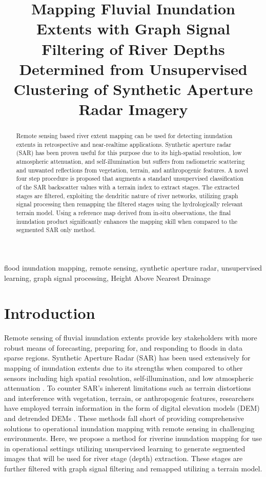 \documentclass{article}
\title{Mapping Fluvial Inundation Extents with Graph Signal Filtering of River Depths Determined from Unsupervised Clustering of Synthetic Aperture Radar Imagery}
\begin{document}
\topmargin=0mm
%
\maketitle
%
\begin{abstract}
Remote sensing based river extent mapping can be used for detecting inundation extents in retrospective and near-realtime applications.
Synthetic aperture radar (SAR) has been proven useful for this purpose due to its high-spatial resolution, low atmospheric attenuation, and self-illumination but suffers from radiometric scattering and unwanted reflections from vegetation, terrain, and anthropogenic features. 
A novel four step procedure is proposed that augments a standard unsupervised classification of the SAR backscatter values with a terrain index to extract stages. 
The extracted stages are filtered, exploiting the dendritic nature of river networks, utilizing graph signal processing then remapping the filtered stages using the hydrologically relevant terrain model. 
Using a reference map derived from in-situ observations, the final inundation product significantly enhances the mapping skill when compared to the segmented SAR only method.
\end{abstract}
%
\begin{keywords}
flood inundation mapping, remote sensing, synthetic aperture radar, unsupervised learning, graph signal processing, Height Above Nearest Drainage
\end{keywords}
%
\section{Introduction}
\label{sec:intro}
%
Remote sensing of fluvial inundation extents provide key stakeholders with more robust means of forecasting, preparing for, and responding to floods in data sparse regions.
Synthetic Aperture Radar (SAR) has been used extensively for mapping of inundation extents \cite{aristizabal2020high,shastry2019using,landuyt2018flood,giustarini2016probabilistic,mason2012near,hess1995delineation,santoro2013multi,saatchi2019sar} due to its strengths when compared to other sensors including high spatial resolution, self-illumination, and low atmospheric attenuation \cite{saatchi2019sar}.
To counter SAR's inherent limitations such as terrain distortions and interference with vegetation, terrain, or anthropogenic features, researchers have employed terrain information in the form of digital elevation models (DEM) and detrended DEMs \cite{aristizabal2020high,shastry2019using,saatchi2019sar,twele2016sentinel,huang2017comparison}.
These methods fall short of providing comprehensive solutions to operational inundation mapping with remote sensing in challenging environments.
Here, we propose a method for riverine inundation mapping for use in operational settings utilizing unsupervised learning to generate segmented images that will be used for river stage (depth) extraction. 
These stages are further filtered with graph signal filtering and remapped utilizing a terrain model.
%
\end{document}
